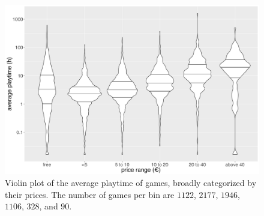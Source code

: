 

\begin{figure}[!t]
	\centering
	\includegraphics[width=1.0\columnwidth]{images/steam-cost-vs-playtime-non-sale.pdf}
	\caption{Violin plot of the average playtime of \steam games, broadly categorized by their prices. The number of games per bin are $1122$, $2177$, $1946$, $1106$, $328$, and $90$.}
\label{fig:steam-cost-vs-playtime-violin}
\end{figure}

